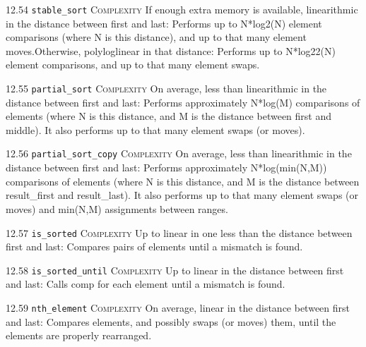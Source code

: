 \noindent\textcolor{cred}{12.54 \texttt{stable\_sort}} \textsc{Complexity} If enough extra memory is available, linearithmic in the distance between first and last: Performs up to N*log2(N) element comparisons (where N is this distance), and up to that many element moves.Otherwise, polyloglinear in that distance: Performs up to N*log22(N) element comparisons, and up to that many element swaps. \vspace{0.5em}

\noindent\textcolor{cred}{12.55 \texttt{partial\_sort}} \textsc{Complexity} On average, less than linearithmic in the distance between first and last: Performs approximately N*log(M) comparisons of elements (where N is this distance, and M is the distance between first and middle). It also performs up to that many element swaps (or moves). \vspace{0.5em}

\noindent\textcolor{cred}{12.56 \texttt{partial\_sort\_copy}} \textsc{Complexity} On average, less than linearithmic in the distance between first and last: Performs approximately N*log(min(N,M)) comparisons of elements (where N is this distance, and M is the distance between result\_first and result\_last). It also performs up to that many element swaps (or moves) and min(N,M) assignments between ranges. \vspace{0.5em}

\noindent\textcolor{corange}{12.57 \texttt{is\_sorted}} \textsc{Complexity} Up to linear in one less than the distance between first and last: Compares pairs of elements until a mismatch is found. \vspace{0.5em}

\noindent\textcolor{corange}{12.58 \texttt{is\_sorted\_until}} \textsc{Complexity} Up to linear in the distance between first and last: Calls comp for each element until a mismatch is found. \vspace{0.5em}

\noindent\textcolor{corange}{12.59 \texttt{nth\_element}} \textsc{Complexity} On average, linear in the distance between first and last: Compares elements, and possibly swaps (or moves) them, until the elements are properly rearranged. \vspace{0.5em}

